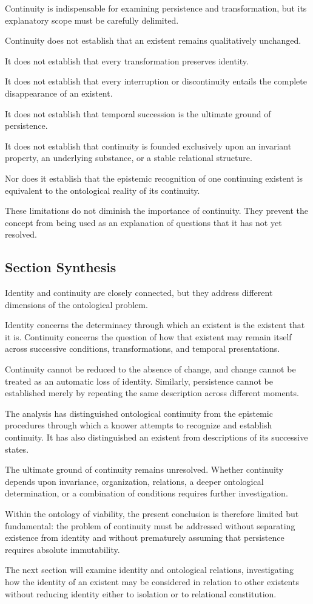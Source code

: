 Continuity is indispensable for examining persistence and transformation, but its explanatory scope must be carefully delimited.

Continuity does not establish that an existent remains qualitatively unchanged.

It does not establish that every transformation preserves identity.

It does not establish that every interruption or discontinuity entails the complete disappearance of an existent.

It does not establish that temporal succession is the ultimate ground of persistence.

It does not establish that continuity is founded exclusively upon an invariant property, an underlying substance, or a stable relational structure.

Nor does it establish that the epistemic recognition of one continuing existent is equivalent to the ontological reality of its continuity.

These limitations do not diminish the importance of continuity. They prevent the concept from being used as an explanation of questions that it has not yet resolved.

\subsection{Section Synthesis}

Identity and continuity are closely connected, but they address different dimensions of the ontological problem.

Identity concerns the determinacy through which an existent is the existent that it is. Continuity concerns the question of how that existent may remain itself across successive conditions, transformations, and temporal presentations.

Continuity cannot be reduced to the absence of change, and change cannot be treated as an automatic loss of identity. Similarly, persistence cannot be established merely by repeating the same description across different moments.

The analysis has distinguished ontological continuity from the epistemic procedures through which a knower attempts to recognize and establish continuity. It has also distinguished an existent from descriptions of its successive states.

The ultimate ground of continuity remains unresolved. Whether continuity depends upon invariance, organization, relations, a deeper ontological determination, or a combination of conditions requires further investigation.

Within the ontology of viability, the present conclusion is therefore limited but fundamental: the problem of continuity must be addressed without separating existence from identity and without prematurely assuming that persistence requires absolute immutability.

The next section will examine identity and ontological relations, investigating how the identity of an existent may be considered in relation to other existents without reducing identity either to isolation or to relational constitution.
